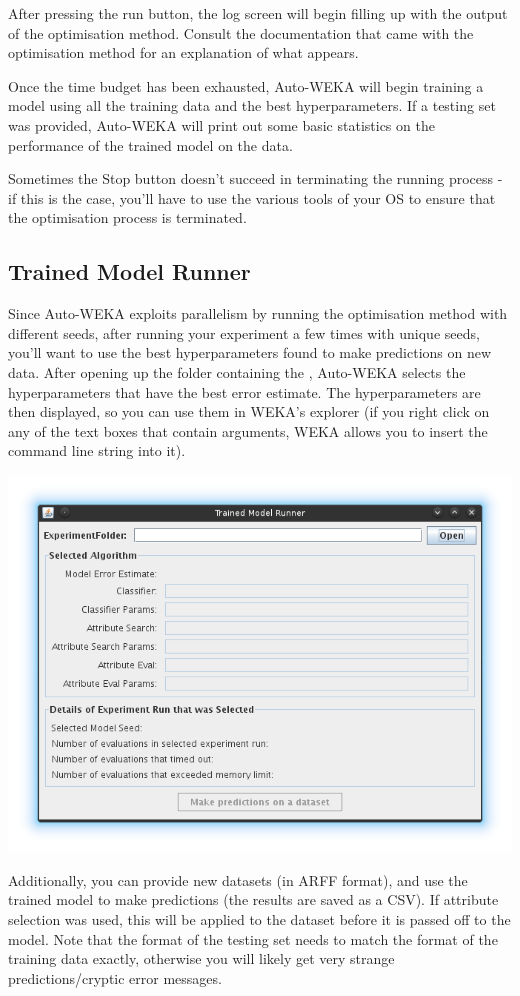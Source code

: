 After pressing the run button, the log screen will begin filling up with the output of the optimisation method. Consult the documentation that came with the optimisation method for an explanation of what appears.

Once the time budget has been exhausted, Auto-WEKA will begin training a model using all the training data and the best hyperparameters. If a testing set was provided, Auto-WEKA will print out some basic statistics on the performance of the trained model on the data.

\begin{aside}
  Sometimes the Stop button doesn't succeed in terminating the running process - if this is the case, you'll have to use the various tools of your OS to ensure that the optimisation process is terminated.
\end{aside}

\subsection{Trained Model Runner}

Since Auto-WEKA exploits parallelism by running the optimisation method with different seeds, after running your experiment a few times with unique seeds, you'll want to use the best hyperparameters found to make predictions on new data. After opening up the folder containing the , Auto-WEKA selects the hyperparameters that have the best error estimate. The hyperparameters are then displayed, so you can use them in WEKA's explorer (if you right click on any of the text boxes that contain arguments,  WEKA allows you to insert the command line string into it).

\begin{center}
  \includegraphics[scale=0.65]{guiscreens/modelrunner.png}
\end{center}

Additionally, you can provide new datasets (in ARFF format),  and use the trained model to make predictions (the results are saved as a CSV). If attribute selection was used,  this will be applied to the dataset before it is passed off to the model. Note that the format of the testing set needs to match the format of the training data exactly, otherwise you will likely get very strange predictions/cryptic error messages. 